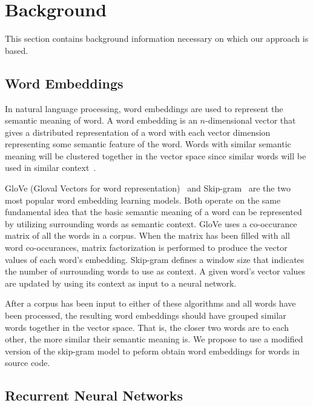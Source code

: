 \section{Background}

This section contains background information necessary on which our approach is based.

\subsection{Word Embeddings}

In natural language processing, word embeddings are used to represent the semantic meaning of word. A word embedding is an $n$-dimensional vector that gives a distributed representation of a word with each vector dimension representing some semantic feature of the word. Words with similar semantic meaning will be clustered together in the vector space since similar words will be used in similar context~\cite{mikolov2013distributed}.

GloVe (Gloval Vectors for word representation)~\cite{pennington2014glove} and Skip-gram~\cite{mikolov2013efficient} are the two most popular word embedding learning models. Both operate on the same fundamental idea that the basic semantic meaning of a word can be represented by utilizing surrounding words as semantic context. GloVe uses a co-occurance matrix of all the words in a corpus. When the matrix has been filled with all word co-occurances, matrix factorization is performed to produce the vector values of each word's embedding. Skip-gram defines a window size that indicates the number of surrounding words to use as context. A given word's vector values are updated by using its context as input to a neural network.

After a corpus has been input to either of these algorithms and all words have been processed, the resulting word embeddings should have grouped similar words together in the vector space. That is, the closer two words are to each other, the more similar their semantic meaning is. We propose to use a modified version of the skip-gram model to peform obtain word embeddings for words in source code.
 
\subsection{Recurrent Neural Networks}



